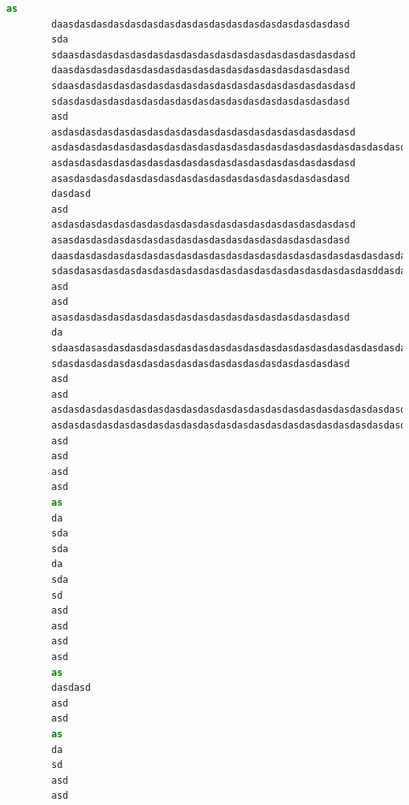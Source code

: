 \begin{lstlisting}[language=Python, caption=Funkce stavového automatu:, frame=single, breaklines=false, postbreak=\mbox{\textcolor{gray}{$\hookrightarrow$}\space}]
        as
        daasdasdasdasdasdasdasdasdasdasdasdasdasdasdasdasdasd
        sda
        sdaasdasdasdasdasdasdasdasdasdasdasdasdasdasdasdasdasd
        daasdasdasdasdasdasdasdasdasdasdasdasdasdasdasdasdasd
        sdaasdasdasdasdasdasdasdasdasdasdasdasdasdasdasdasdasd
        sdasdasdasdasdasdasdasdasdasdasdasdasdasdasdasdasdasd
        asd
        asdasdasdasdasdasdasdasdasdasdasdasdasdasdasdasdasdasd
        asdasdasdasdasdasdasdasdasdasdasdasdasdasdasdasdasdasdasdasdasdasdasdasdasdasdasdasdasdasdasdasdasdasdasd
        asdasdasdasdasdasdasdasdasdasdasdasdasdasdasdasdasdasd
        asasdasdasdasdasdasdasdasdasdasdasdasdasdasdasdasdasd
        dasdasd
        asd
        asdasdasdasdasdasdasdasdasdasdasdasdasdasdasdasdasdasd
        asasdasdasdasdasdasdasdasdasdasdasdasdasdasdasdasdasd
        daasdasdasdasdasdasdasdasdasdasdasdasdasdasdasdasdasdasdasdasdasdasdasdasdasdasdasdasdasdasdasdasdasdasdasdasdasdasdasdasdasdasdasdasdasdasdasdasdasdasdasd
        sdasdasasdasdasdasdasdasdasdasdasdasdasdasdasdasdasdasdasddasdasdasdasdasdasdasdasdasdasdasdasdasdasdasdasdasdasdasdasdasdasdasdasdasdasdasdasdasdasdasdasd
        asd
        asd
        asasdasdasdasdasdasdasdasdasdasdasdasdasdasdasdasdasd
        da
        sdaasdasasdasdasdasdasdasdasdasdasdasdasdasdasdasdasdasdasdasdasdasdasdasdasdasdasdasdasdasdasdasdasdasdasdasddasdasdasdasdasdasdasdasdasdasdasdasdasdasdasdasdasdasdasdasdasdasdasdasdasdasdasdasdasdasdasdasd
        sdasdasdasdasdasdasdasdasdasdasdasdasdasdasdasdasdasd
        asd
        asd
        asdasdasdasdasdasdasdasdasdasdasdasdasdasdasdasdasdasdasdasdasdasdasdasdasdasdasdasdasdasdasdasdasdasdasdasdasdasdasdasdasdasdasdasdasdasdasdasdasdasdasdasdasdasdasdasdasdasdasdasdasdasdasdasdasdasdasdasdasdasdasdasdasdasdasdasdasdasdasdasdasdasdasdasdasdasdasdasdasdasdasdasdasdasdasdasdasdasdasdasdasdasdasdasdasdasdasdasdasdasdasdasdasdasdasdasdasdasdasdasdasdasdasdasdasdasdasdasdasdasdasdasdasdasdasdasdasd
        asdasdasdasdasdasdasdasdasdasdasdasdasdasdasdasdasdasdasdasdasdasdasdasdasdasdasdasdasdasdasdasdasdasdasdasdasdasdasdasdasdasdasdasdasdasdasdasdasdasdasdasdasdasdasdasdasdasdasdasdasdasdasdasdasdasdasdasdasdasdasdasdasdasdasdasdasdasdasdasdasdasdasdasdasdasdasdasdasdasdasdasdasdasdasdasdasdasdasdasdasdasdasdasdasdasdasdasdasdasdasdasdasdasdasdasdasdasdasdasd
        asd
        asd
        asd
        asd
        as
        da
        sda
        sda
        da
        sda
        sd
        asd
        asd
        asd
        asd
        as
        dasdasd
        asd
        asd
        as
        da
        sd
        asd
        asd

\end{lstlisting}
